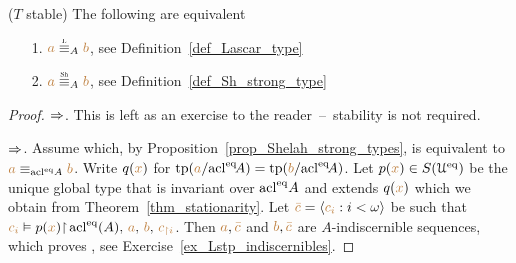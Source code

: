 

\begin{corollary}
($T$ stable)
The following are equivalent
\begin{itemize}
\item[1.] ${\mr a}\equivL_A{\mr b}$, see Definition~\ref{def_Lascar_type}
\item[2.] ${\mr a}\equivSh_A{\mr b}$, see Definition~\ref{def_Sh_strong_type}
\end{itemize}
\end{corollary}
\begin{proof}$\Rightarrow$.
  This is left as an exercise to the reader~--~stability is not required.

  $\Rightarrow$.
  Assume  which, by Proposition~\ref{prop_Shelah_strong_types}, is equivalent to ${\color{brown} a}\equiv_{\mathop{\rm acl}^{{\rm eq}}\!A}{\color{brown} b}$.
  Write $q({\color{brown} x})$ for ${\rm tp}({\color{brown} a}/{\mathop{\rm acl}}^{{\rm eq}}\!A)={\rm tp}({\color{brown} b}/{\mathop{\rm acl}}^{{\rm eq}}\!A)$. Let $p({\color{brown} x})\in S(\EuScript U^{{\rm eq}})$ be the unique global type that is invariant over $\mathop{\rm acl}^{{\rm eq}}\!A$ and extends $q({\color{brown} x})$ which we obtain from Theorem~\ref{thm_stationarity}.
  Let ${\color{brown}\bar c}=\langle{\color{brown}c_i}:i<\omega\rangle$ be such that ${\color{brown} c_i}\vDash p({\color{brown} x}){\restriction}\mathop{\rm acl}^{{\rm eq}}(A),\,{\color{brown} a},\,{\color{brown} b},\,{\color{brown} c_{\restriction i}}$.
  Then ${\color{brown} a},{\color{brown}\bar c}$ and ${\color{brown} b},{\color{brown}\bar c}$ are $A$-indiscernible sequences, which proves , see Exercise~\ref{ex_Lstp_indiscernibles}.
\end{proof}


